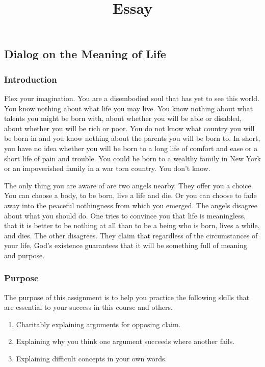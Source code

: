 \documentclass[]{article}
\title{Essay}
\date{}
\begin{document}
\maketitle

\subsection{Dialog on the Meaning of
Life}\label{dialog-on-the-meaning-of-life}

\subsubsection{Introduction}\label{introduction}

Flex your imagination. You are a disembodied soul that has yet to see
this world. You know nothing about what life you may live. You know
nothing about what talents you might be born with, about whether you
will be able or disabled, about whether you will be rich or poor. You do
not know what country you will be born in and you know nothing about the
parents you will be born to. In short, you have no idea whether you will
be born to a long life of comfort and ease or a short life of pain and
trouble. You could be born to a wealthy family in New York or an
impoverished family in a war torn country. You don't know.

The only thing you are aware of are two angels nearby. They offer you a
choice. You can choose a body, to be born, live a life and die. Or you
can choose to fade away into the peaceful nothingness from which you
emerged. The angels disagree about what you should do. One tries to
convince you that life is meaningless, that it is better to be nothing
at all than to be a being who is born, lives a while, and dies. The
other disagrees. They claim that regardless of the circumstances of your
life, God's existence guarantees that it will be something full of
meaning and purpose.

\subsubsection{Purpose}\label{purpose}

The purpose of this assignment is to help you practice the following
skills that are essential to your success in this course and others.

\begin{enumerate}
\def\labelenumi{\arabic{enumi}.}
\itemsep1pt\parskip0pt
\item
  Charitably explaining arguments for opposing claim.
\item
  Explaining why you think one argument succeeds where another fails.
\item
  Explaining difficult concepts in your own words.
\end{enumerate}
\end{document}
